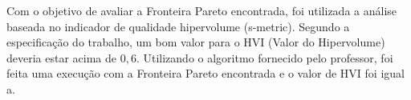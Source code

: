 Com o objetivo de avaliar a Fronteira Pareto encontrada, foi utilizada a análise baseada no indicador de qualidade hipervolume (s-metric). Segundo a especificação do trabalho, um bom valor para o HVI (Valor do Hipervolume) deveria estar acima de $0,6$. Utilizando o algoritmo fornecido pelo professor, foi feita uma execução com a Fronteira Pareto encontrada e o valor de HVI foi igual a.